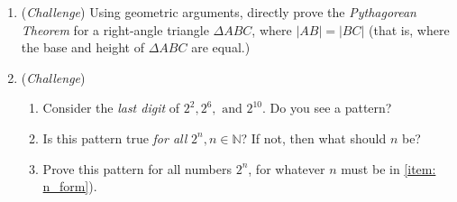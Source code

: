 \documentclass[10pt,a4paper,fleqn]{article}
\newcommand{\challenge}{(\emph{Challenge}) }
\begin{document}
\begin{enumerate}
			\item \challenge Using geometric arguments, directly prove the \emph{Pythagorean Theorem} for a right-angle triangle $\Delta ABC$, where $|AB|=|BC|$ (that is, where the base and height of $\Delta ABC$ are equal.) 
			\item \challenge
				\begin{enumerate}
					\item Consider the \emph{last digit} of $2^2, 2^6, \text{ and } 2^{10}$. Do you see a pattern?
					\item Is this pattern true \emph{for all} $2^n, n\in\mathbb{N}$? If not, then what should $n$ be? \label{item: n_form}
					\item Prove this pattern for all numbers $2^n$, for whatever $n$ must be in \ref{item: n_form}).
				\end{enumerate}
			
		\end{enumerate}
	
\end{document}
